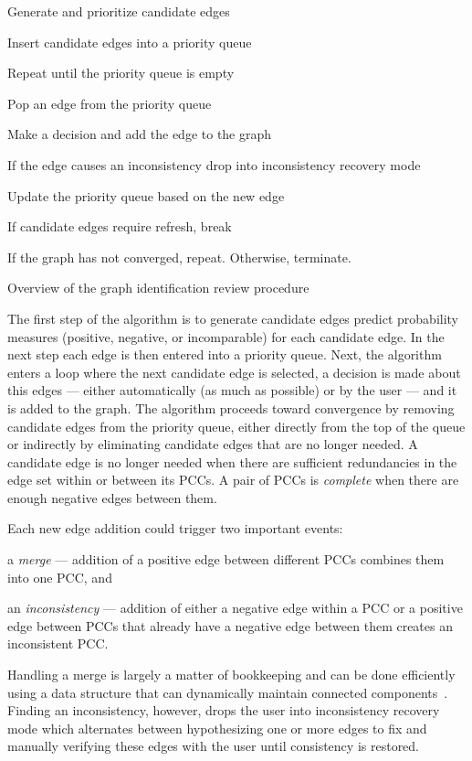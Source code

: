 \begin{algorithm}
    \begin{enumln}
    \item Generate and prioritize candidate edges 
    \item Insert candidate edges into a priority queue 
    \item Repeat until the priority queue is empty
    \begin{enumln}
        \item Pop an edge from the priority queue
        \item Make a decision and add the edge to the graph
        \item If the edge causes an inconsistency drop into inconsistency recovery mode
        \item Update the priority queue based on the new edge
        \item If candidate edges require refresh, break
    \end{enumln}
    \item If the graph has not converged, repeat. Otherwise, terminate.
    \end{enumln}
\caption[Algorithm Overview]{Overview of the graph identification review procedure}
\label{alg:AlgoOverview}
\end{algorithm}

The first step of the algorithm is to generate candidate edges predict probability measures (positive, negative,
  or incomparable) for each candidate edge.
In the next step each edge is then entered into a priority queue.
Next, the algorithm enters a loop where the next candidate edge is selected, a decision is made about this edges
  --- either automatically (as much as possible) or by the user --- and it is added to the graph.
The algorithm proceeds toward convergence by removing candidate edges from the priority queue, either directly
  from the top of the queue or indirectly by eliminating candidate edges that are no longer needed.
A candidate edge is no longer needed when there are sufficient redundancies in the edge set within or between its
  PCCs.
A pair of PCCs is \emph{complete} when there are enough negative edges between them.

Each new edge addition could trigger two important events:
\begin{enumin}
    \item a \emph{merge} --- addition of a positive edge between different
      PCCs combines them into one PCC, and

    \item an \emph{inconsistency} --- addition of either a negative edge within a PCC or a positive edge between
      PCCs that already have a negative edge between them creates an inconsistent PCC.
\end{enumin}
Handling a merge is largely a matter of bookkeeping and can be done efficiently using a data structure that can
  dynamically maintain connected components~\cite{TODO}.
Finding an inconsistency, however, drops the user into inconsistency recovery mode which alternates between
  hypothesizing one or more edges to fix and manually verifying these edges with the user until consistency is
  restored.


